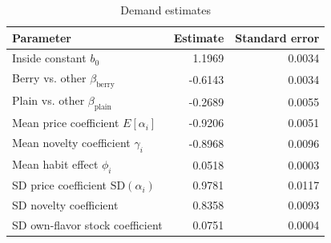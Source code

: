 \begin{table}[htbp]\centering\small
\caption{Demand estimates}
\label{tab:demand-estimates}
\begin{tabular}{lrr}\toprule
Parameter & Estimate & Standard error \\
\midrule
Inside constant $b_0$ & 1.1969 & 0.0034 \\
Berry vs. other $\beta_{\mathrm{berry}}$ & -0.6143 & 0.0034 \\
Plain vs. other $\beta_{\mathrm{plain}}$ & -0.2689 & 0.0055 \\
Mean price coefficient $E[\alpha_i]$ & -0.9206 & 0.0051 \\
Mean novelty coefficient $\gamma_i$ & -0.8968 & 0.0096 \\
Mean habit effect $\phi_i$ & 0.0518 & 0.0003 \\
SD price coefficient $\mathrm{SD}(\alpha_i)$ & 0.9781 & 0.0117 \\
SD novelty coefficient & 0.8358 & 0.0093 \\
SD own-flavor stock coefficient & 0.0751 & 0.0004 \\
\bottomrule\end{tabular}
\end{table}
